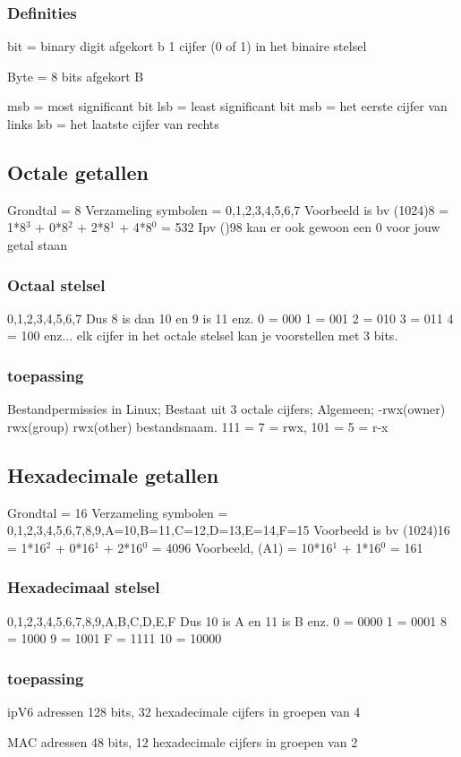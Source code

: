 \documentclass{article}
\begin{document}
\subsubsection{Definities}
bit = binary digit
afgekort b
1 cijfer (0 of 1) in het binaire stelsel

Byte = 8 bits
afgekort B

msb = most significant bit
lsb = least significant bit
msb = het eerste cijfer van links
lsb = het laatste cijfer van rechts
\subsection{Octale getallen}
Grondtal = 8
Verzameling symbolen = {0,1,2,3,4,5,6,7}
Voorbeeld is bv (1024)8 = 1*8$^3$ + 0*8$^2$ + 2*8$^1$ + 4*8$^0$ = 532
Ipv ()98 kan er ook gewoon een 0 voor jouw getal staan

\subsubsection{Octaal stelsel}
0,1,2,3,4,5,6,7
Dus 8 is dan 10 en 9 is 11 enz.
0 = 000
1 = 001
2 = 010
3 = 011
4 = 100
enz...
elk cijfer in het octale stelsel kan je voorstellen met 3 bits.
\subsubsection{toepassing}
Bestandpermissies in Linux;
Bestaat uit 3 octale cijfers;
Algemeen; -rwx(owner) rwx(group) rwx(other) bestandsnaam.
111 = 7 = rwx, 101 = 5 = r-x
\subsection{Hexadecimale getallen}
Grondtal = 16
Verzameling symbolen = {0,1,2,3,4,5,6,7,8,9,A=10,B=11,C=12,D=13,E=14,F=15}
Voorbeeld is bv (1024)16 = 1*16$^2$ + 0*16$^1$ + 2*16$^0$ = 4096
Voorbeeld, (A1) = 10*16$^1$ + 1*16$^0$ = 161
\subsubsection{Hexadecimaal stelsel}
0,1,2,3,4,5,6,7,8,9,A,B,C,D,E,F
Dus 10 is A en 11 is B enz.
0 = 0000
1 = 0001
8 = 1000
9 = 1001
F = 1111
10 = 10000
\subsubsection{toepassing}
ipV6 adressen
128 bits, 32 hexadecimale cijfers in groepen van 4

MAC adressen
48 bits, 12 hexadecimale cijfers in groepen van 2
\end{document}
